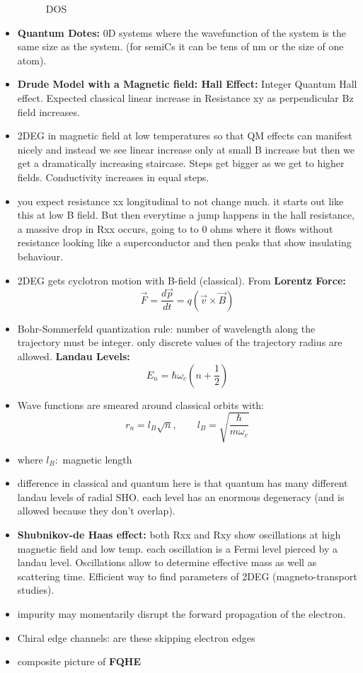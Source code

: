 \begin{itemize}
\begin{figure}
    \caption{DOS}
    \label{fig:DOS}
    \end{figure}
    \item \textbf{Quantum Dotes:} 0D systems where the wavefunction of the system is the same size as the system. (for semiCs it can be tens of nm or the size of one atom).
    \item \textbf{Drude Model with a Magnetic field: Hall Effect:} Integer Quantum Hall effect. Expected classical linear increase in Resistance xy as perpendicular Bz field increases. 
    \item 2DEG in magnetic field at low temperatures so that QM effects can manifest nicely and instead we see linear increase only at small B increase but then we get a dramatically increasing staircase. Steps get bigger as we get to higher fields. Conductivity increases in equal steps.
    \item you expect resistance xx longitudinal to not change much. it starts out like this at low B field. But then everytime a jump happens in the hall resistance, a massive drop in Rxx occurs, going to to 0 ohms where it flows without resistance looking like a superconductor and then peaks that show insulating behaviour.
    \item 2DEG gets cyclotron motion with B-field (classical). From \textbf{Lorentz Force:}
    \begin{equation}
        \vec{F} = \frac{d\vec{p}}{dt} = q(\vec{v} \times \vec{B})
    \end{equation}
    \item Bohr-Sommerfeld quantization rule: number of wavelength along the trajectory must be integer. only discrete values of the trajectory radius are allowed. \textbf{Landau Levels:}
    \begin{equation}
        E_n = \hbar \omega_c (n+\frac{1}{2})
    \end{equation}
    \item Wave functions are smeared around classical orbits with:
    \begin{equation}
        r_n = l_B \sqrt{n} , \qquad l_B = \sqrt{\frac{\hbar}{m \omega_c}}
    \end{equation}
    \item where $l_B:$ magnetic length
    \item difference in classical and quantum here is that quantum has many different landau levels of radial SHO. each level has an enormous degeneracy (and is allowed because they don't overlap).  
    \item \textbf{Shubnikov-de Haas effect:} both Rxx and Rxy show oscillations at high magnetic field and low temp. each oscillation is a Fermi level pierced by a landau level. Oscillations allow to determine effective mass as well as scattering time. Efficient way to find parameters of 2DEG (magneto-transport studies).
    \item impurity may momentarily disrupt the forward propagation of the electron.
    \item Chiral edge channels: are these skipping electron edges
    \item composite picture of \textbf{FQHE}
    
    
\end{itemize}
